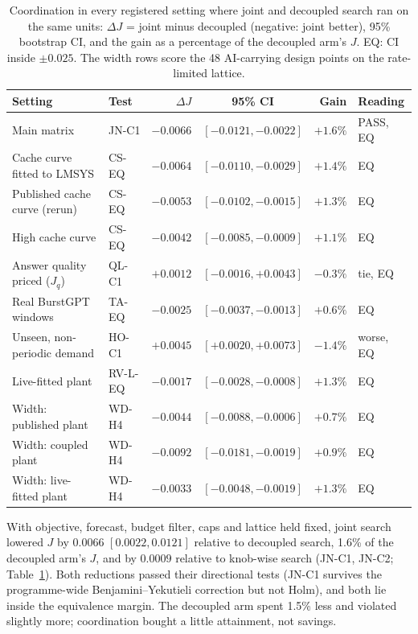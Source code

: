 \begin{table}[t]
\caption{Coordination in every registered setting where joint and
decoupled search ran on the same units: $\Delta J$ = joint minus decoupled
(negative: joint better), 95\% bootstrap CI, and the gain as a percentage
of the decoupled arm's $J$. EQ: CI inside $\pm0.025$. The width rows score
the 48 AI-carrying design points on the rate-limited lattice.}
\label{tab:coord}
\centering\footnotesize\setlength{\tabcolsep}{2.5pt}
\begin{tabular}{@{}l l r c r l@{}}
\toprule
Setting & Test & $\Delta J$ & 95\% CI & Gain & Reading \\
\midrule
Main matrix & JN-C1 & $-0.0066$ & $[-0.0121,-0.0022]$ & $+1.6\%$ & PASS, EQ \\
Cache curve fitted to LMSYS & CS-EQ & $-0.0064$ & $[-0.0110,-0.0029]$ & $+1.4\%$ & EQ \\
Published cache curve (rerun) & CS-EQ & $-0.0053$ & $[-0.0102,-0.0015]$ & $+1.3\%$ & EQ \\
High cache curve & CS-EQ & $-0.0042$ & $[-0.0085,-0.0009]$ & $+1.1\%$ & EQ \\
Answer quality priced ($J_q$) & QL-C1 & $+0.0012$ & $[-0.0016,+0.0043]$ & $-0.3\%$ & tie, EQ \\
Real BurstGPT windows & TA-EQ & $-0.0025$ & $[-0.0037,-0.0013]$ & $+0.6\%$ & EQ \\
Unseen, non-periodic demand & HO-C1 & $+0.0045$ & $[+0.0020,+0.0073]$ & $-1.4\%$ & worse, EQ \\
Live-fitted plant & RV-L-EQ & $-0.0017$ & $[-0.0028,-0.0008]$ & $+1.3\%$ & EQ \\
Width: published plant & WD-H4 & $-0.0044$ & $[-0.0088,-0.0006]$ & $+0.7\%$ & EQ \\
Width: coupled plant & WD-H4 & $-0.0092$ & $[-0.0181,-0.0019]$ & $+0.9\%$ & EQ \\
Width: live-fitted plant & WD-H4 & $-0.0033$ & $[-0.0048,-0.0019]$ & $+1.3\%$ & EQ \\
\bottomrule
\end{tabular}
\end{table}

With objective, forecast, budget filter, caps and lattice held fixed,
joint search lowered $J$ by $0.0066$ $[0.0022,0.0121]$ relative to
decoupled search, 1.6\% of the decoupled arm's $J$, and by $0.0009$
relative to knob-wise search (JN-C1, JN-C2; Table~\ref{tab:coord}). Both
reductions passed their directional tests (JN-C1 survives the
programme-wide Benjamini--Yekutieli correction but not Holm), and both lie
inside the equivalence margin. The decoupled arm spent 1.5\% less and violated
slightly more; coordination bought a little attainment, not savings.

